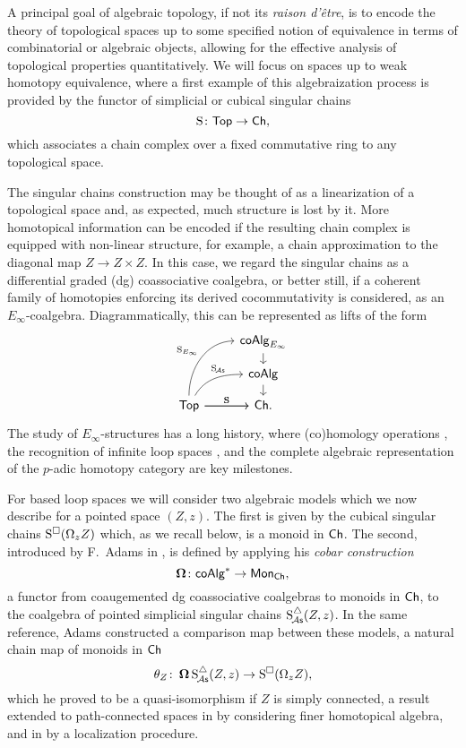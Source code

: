 A principal goal of algebraic topology, if not its \textit{raison d'\^{e}tre}, is to encode the theory of topological spaces up to some specified notion of equivalence in terms of combinatorial or algebraic objects, allowing for the effective analysis of topological properties quantitatively.
We will focus on spaces up to weak homotopy equivalence, where a first example of this algebraization process is provided by the functor of simplicial or cubical singular chains
\[
\operatorname{S} \colon \mathsf{Top} \to \mathsf{Ch},
\]
which associates a chain complex over a fixed commutative ring to any topological space.

The singular chains construction may be thought of as a linearization of a topological space and, as expected, much structure is lost by it.
More homotopical information can be encoded if the resulting chain complex is equipped with non-linear structure, for example, a chain approximation to the diagonal map $Z \to Z \times Z$.
In this case, we regard the singular chains as a differential graded (dg) coassociative coalgebra, or better still, if a coherent family of homotopies enforcing its derived cocommutativity is considered, as an $E_\infty$-coalgebra.
Diagrammatically, this can be represented as lifts of the form
\begin{equation}
\begin{tikzcd}[column sep=normal, row sep=small]
& \coAlg_{E_\infty} \arrow[d] \\
& \coAlg \arrow[d] \\
\Top \arrow[uur, "\Schains_{E_\infty}", out=90, in=180] \arrow[r, "\Schains"]
\arrow[ur, "\SchainsA", out=60, in=180, near end]
\arrow[r, "\Schains"]
& \Ch.
\end{tikzcd}
\end{equation}
The study of $E_\infty$-structures has a long history, where (co)homology operations \cite{steenrod1962cohomology, may1970general}, the recognition of infinite loop spaces \cite{boardman1973homotopy, may1972geometry}, and the complete algebraic representation of the $p$-adic homotopy category \cite{mandell2001padic} are key milestones.

For based loop spaces we will consider two algebraic models which we now describe for a pointed space $(Z, z)$.
The first is given by the cubical singular chains $\operatorname{S^{\square}}(\Omega_z Z)$ which, as we recall below, is a monoid in $\mathsf{Ch}$.
The second, introduced by F.~Adams in \cite{adams1956cobar}, is defined by applying his \textit{cobar construction}
\[
\operatorname{\mathbf{\Omega}} \colon \mathsf{coAlg}^\ast \to \mathsf{Mon}_{\mathsf{Ch}},
\]
a functor from coaugemented dg coassociative coalgebras to monoids in $\mathsf{Ch}$, to the coalgebra of pointed simplicial singular chains $\operatorname{S^{\triangle}_{\!{\mathcal{A}\mathsf{s}}}}(Z,z)$.
In the same reference, Adams constructed a comparison map between these models, a natural chain map of monoids in $\mathsf{Ch}$
\begin{equation} \label{e:adams map}
\theta_Z \colon \operatorname{\mathbf{\Omega}} \operatorname{S^{\triangle}_{\!{\mathcal{A}\mathsf{s}}}}(Z,z) \to \operatorname{S^{\square}}(\Omega_z Z),
\end{equation}
which he proved to be a quasi-isomorphism if $Z$ is simply connected, a result extended to path-connected spaces in \cite{rivera2018cubical} by considering finer homotopical algebra, and in \cite{hess2010cobar} by a localization procedure.


